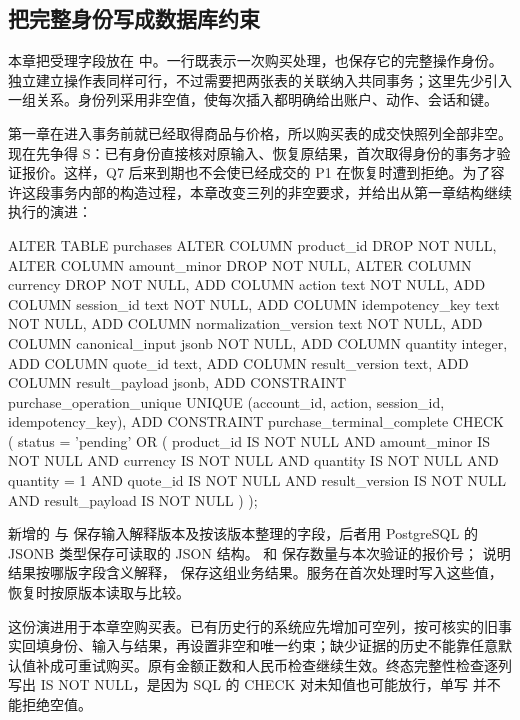 \subsection*{把完整身份写成数据库约束}

本章把受理字段放在  中。一行既表示一次购买处理，也保存它的完整操作身份。独立建立操作表同样可行，不过需要把两张表的关联纳入共同事务；这里先少引入一组关系。身份列采用非空值，使每次插入都明确给出账户、动作、会话和键。

第一章在进入事务前就已经取得商品与价格，所以购买表的成交快照列全部非空。现在先争得 S：已有身份直接核对原输入、恢复原结果，首次取得身份的事务才验证报价。这样，Q7 后来到期也不会使已经成交的 P1 在恢复时遭到拒绝。为了容许这段事务内部的构造过程，本章改变三列的非空要求，并给出从第一章结构继续执行的演进：

\begin{BookCode}
ALTER TABLE purchases
  ALTER COLUMN product_id DROP NOT NULL,
  ALTER COLUMN amount_minor DROP NOT NULL,
  ALTER COLUMN currency DROP NOT NULL,
  ADD COLUMN action text NOT NULL,
  ADD COLUMN session_id text NOT NULL,
  ADD COLUMN idempotency_key text NOT NULL,
  ADD COLUMN normalization_version text NOT NULL,
  ADD COLUMN canonical_input jsonb NOT NULL,
  ADD COLUMN quantity integer,
  ADD COLUMN quote_id text,
  ADD COLUMN result_version text,
  ADD COLUMN result_payload jsonb,
  ADD CONSTRAINT purchase_operation_unique
    UNIQUE (account_id, action, session_id, idempotency_key),
  ADD CONSTRAINT purchase_terminal_complete CHECK (
    status = 'pending' OR (
      product_id IS NOT NULL AND amount_minor IS NOT NULL
      AND currency IS NOT NULL AND quantity IS NOT NULL
      AND quantity = 1 AND quote_id IS NOT NULL
      AND result_version IS NOT NULL AND result_payload IS NOT NULL
    )
  );
\end{BookCode}

新增的  与  保存输入解释版本及按该版本整理的字段，后者用 PostgreSQL 的 JSONB 类型保存可读取的 JSON 结构。 和  保存数量与本次验证的报价号； 说明结果按哪版字段含义解释， 保存这组业务结果。服务在首次处理时写入这些值，恢复时按原版本读取与比较。

这份演进用于本章空购买表。已有历史行的系统应先增加可空列，按可核实的旧事实回填身份、输入与结果，再设置非空和唯一约束；缺少证据的历史不能靠任意默认值补成可重试购买。原有金额正数和人民币检查继续生效。终态完整性检查逐列写出 IS NOT NULL，是因为 SQL 的 CHECK 对未知值也可能放行，单写  并不能拒绝空值。


